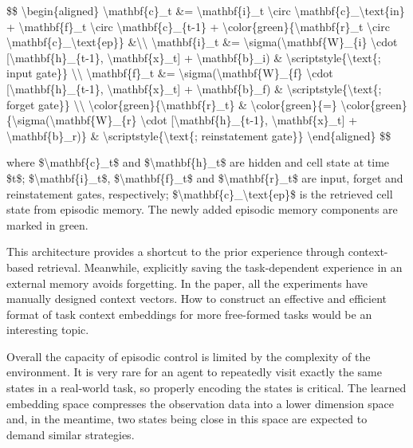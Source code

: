 \$\$ \textbackslash begin\{aligned\} \textbackslash mathbf\{c\}\_t \&= \textbackslash mathbf\{i\}\_t \textbackslash circ \textbackslash mathbf\{c\}\_\textbackslash text\{in\} + \textbackslash mathbf\{f\}\_t \textbackslash circ \textbackslash mathbf\{c\}\_\{t-1\} + \textbackslash color\{green\}\{\textbackslash mathbf\{r\}\_t \textbackslash circ \textbackslash mathbf\{c\}\_\textbackslash text\{ep\}\} \&\textbackslash\textbackslash{} \textbackslash mathbf\{i\}\_t \&= \textbackslash sigma(\textbackslash mathbf\{W\}\_\{i\} \textbackslash cdot {[}\textbackslash mathbf\{h\}\_\{t-1\}, \textbackslash mathbf\{x\}\_t{]} + \textbackslash mathbf\{b\}\_i) \& \textbackslash scriptstyle\{\textbackslash text\{; input gate\}\} \textbackslash\textbackslash{} \textbackslash mathbf\{f\}\_t \&= \textbackslash sigma(\textbackslash mathbf\{W\}\_\{f\} \textbackslash cdot {[}\textbackslash mathbf\{h\}\_\{t-1\}, \textbackslash mathbf\{x\}\_t{]} + \textbackslash mathbf\{b\}\_f) \& \textbackslash scriptstyle\{\textbackslash text\{; forget gate\}\} \textbackslash\textbackslash{} \textbackslash color\{green\}\{\textbackslash mathbf\{r\}\_t\} \& \textbackslash color\{green\}\{=\} \textbackslash color\{green\}\{\textbackslash sigma(\textbackslash mathbf\{W\}\_\{r\} \textbackslash cdot {[}\textbackslash mathbf\{h\}\_\{t-1\}, \textbackslash mathbf\{x\}\_t{]} + \textbackslash mathbf\{b\}\_r)\} \& \textbackslash scriptstyle\{\textbackslash text\{; reinstatement gate\}\} \textbackslash end\{aligned\} \$\$

where \$\textbackslash mathbf\{c\}\_t\$ and \$\textbackslash mathbf\{h\}\_t\$ are hidden and cell state at time \$t\$; \$\textbackslash mathbf\{i\}\_t\$, \$\textbackslash mathbf\{f\}\_t\$ and \$\textbackslash mathbf\{r\}\_t\$ are input, forget and reinstatement gates, respectively; \$\textbackslash mathbf\{c\}\_\textbackslash text\{ep\}\$ is the retrieved cell state from episodic memory. The newly added episodic memory components are marked in green.

This architecture provides a shortcut to the prior experience through context-based retrieval. Meanwhile, explicitly saving the task-dependent experience in an external memory avoids forgetting. In the paper, all the experiments have manually designed context vectors. How to construct an effective and efficient format of task context embeddings for more free-formed tasks would be an interesting topic.

Overall the capacity of episodic control is limited by the complexity of the environment. It is very rare for an agent to repeatedly visit exactly the same states in a real-world task, so properly encoding the states is critical. The learned embedding space compresses the observation data into a lower dimension space and, in the meantime, two states being close in this space are expected to demand similar strategies.

